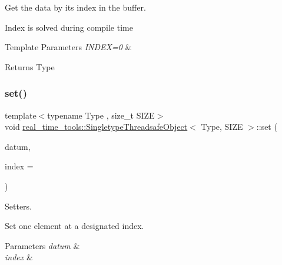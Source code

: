Get the data by its index in the buffer. 

Index is solved during compile time


\begin{DoxyTemplParams}{Template Parameters}
{\em I\+N\+D\+E\+X=0} & \\
\hline
\end{DoxyTemplParams}
\begin{DoxyReturn}{Returns}
Type 
\end{DoxyReturn}
\mbox{\label{classreal__time__tools_1_1SingletypeThreadsafeObject_a6d09deb1c28dcddee0a3986184af7bd5}} 
\subsubsection{\texorpdfstring{set()}{set()}\hspace{0.1cm}{\footnotesize\ttfamily [1/3]}}
{\footnotesize\ttfamily template$<$typename Type , size\+\_\+t S\+I\+ZE$>$ \\
void \hyperlink{classreal__time__tools_1_1SingletypeThreadsafeObject}{real\+\_\+time\+\_\+tools\+::\+Singletype\+Threadsafe\+Object}$<$ Type, S\+I\+ZE $>$\+::set (\begin{DoxyParamCaption}\item[{const Type \&}]{datum,  }\item[{const size\+\_\+t \&}]{index = {} }\end{DoxyParamCaption})}



Setters. 

Set one element at a designated index.


\begin{DoxyParams}{Parameters}
{\em datum} & \\
\hline
{\em index} & \\
\hline
\end{DoxyParams}
\mbox{\label{classreal__time__tools_1_1SingletypeThreadsafeObject_a1f852a4b68d3a0ff112cb9c5d7c6b33e}} 
